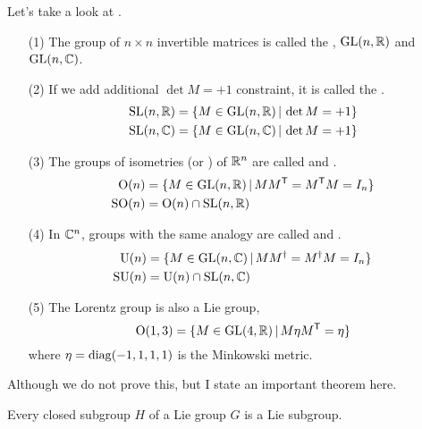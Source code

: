 \documentclass[a4paper, 10pt]{article}
\begin{document}
\begin{example}
    Let's take a look at .
    \begin{itemize}
        \item[(1)] The group of $n \times n$ invertible matrices is called the , $\mathrm{GL}(n,\mathbb{R})$ and $\mathrm{GL}(n,\mathbb{C})$.
        \item[(2)] If we add additional $\det M = +1$ constraint, it is called the .
        \begin{align*}
            \mathrm{SL}(n, \mathbb{R}) &= \{ M \in \mathrm{GL}(n, \mathbb{R}) \,|\, \det M = +1 \} \\
            \mathrm{SL}(n, \mathbb{C}) &= \{ M \in \mathrm{GL}(n, \mathbb{C}) \,|\, \det M = +1 \}
        \end{align*}
        \item[(3)] The groups of isometries (or ) of $\mathbb{R}^{n}$ are called  and .
        \begin{align*}
            \mathrm{O}(n) &= \{ M \in \mathrm{GL}(n, \mathbb{R}) \,|\, MM^{\mathsf{T}} = M^{\mathsf{T}}M = I_{n} \} \\
            \mathrm{SO}(n) &= \mathrm{O}(n) \cap \mathrm{SL}(n, \mathbb{R})
        \end{align*}
        \item[(4)] In $\mathbb{C}^{n}$, groups with the same analogy are called  and .
        \begin{align*}
            \mathrm{U}(n) &= \{ M \in \mathrm{GL}(n, \mathbb{C}) \,|\, MM^{\dagger} = M^{\dagger}M = I_{n} \} \\
            \mathrm{SU}(n) &= \mathrm{U}(n) \cap \mathrm{SL}(n, \mathbb{C})
        \end{align*}
        \item[(5)] The Lorentz group is also a Lie group,
        \[ \mathrm{O}(1,3) = \{ M \in \mathrm{GL}(4, \mathbb{R}) \,|\, M\eta M^{\mathsf{T}} = \eta \} \]
        where $\eta = \mathrm{diag}(-1, 1, 1, 1)$ is the Minkowski metric.
    \end{itemize}
\end{example}

Although we do not prove this, but I state an important theorem here.
\begin{theorem}
    Every closed subgroup $H$ of a Lie group $G$ is a Lie subgroup.
\end{theorem}

\seprule
\end{document}
